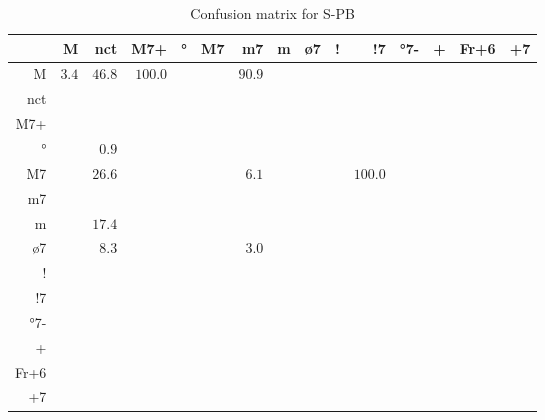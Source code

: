 \documentclass{article}
\begin{document}
\begin{table}
\begin{center}
\begin{tabular}{r|r|r|r|r|r|r|r|r|r|r|r|r|r|r}
       & M & nct & M7+ & ° & M7 & m7 & m & ø7 & ! & !7 & °7- & + & Fr+6 & +7 \\ \hline
 M & $3.4$ & $46.8$ & $100.0$ & $ $ & $ $ & $90.9$ & $ $ & $ $ & $ $ & $ $ & $ $ & $ $ & $ $ & $ $  \\ \hline
 nct & $ $ & $ $ & $ $ & $ $ & $ $ & $ $ & $ $ & $ $ & $ $ & $ $ & $ $ & $ $ & $ $ & $ $  \\ \hline
 M7+ & $ $ & $ $ & $ $ & $ $ & $ $ & $ $ & $ $ & $ $ & $ $ & $ $ & $ $ & $ $ & $ $ & $ $  \\ \hline
 ° & $ $ & $0.9$ & $ $ & $ $ & $ $ & $ $ & $ $ & $ $ & $ $ & $ $ & $ $ & $ $ & $ $ & $ $  \\ \hline
 M7 & $ $ & $26.6$ & $ $ & $ $ & $ $ & $6.1$ & $ $ & $ $ & $ $ & $100.0$ & $ $ & $ $ & $ $ & $ $  \\ \hline
 m7 & $ $ & $ $ & $ $ & $ $ & $ $ & $ $ & $ $ & $ $ & $ $ & $ $ & $ $ & $ $ & $ $ & $ $  \\ \hline
 m & $ $ & $17.4$ & $ $ & $ $ & $ $ & $ $ & $ $ & $ $ & $ $ & $ $ & $ $ & $ $ & $ $ & $ $  \\ \hline
 ø7 & $ $ & $8.3$ & $ $ & $ $ & $ $ & $3.0$ & $ $ & $ $ & $ $ & $ $ & $ $ & $ $ & $ $ & $ $  \\ \hline
 ! & $ $ & $ $ & $ $ & $ $ & $ $ & $ $ & $ $ & $ $ & $ $ & $ $ & $ $ & $ $ & $ $ & $ $  \\ \hline
 !7 & $ $ & $ $ & $ $ & $ $ & $ $ & $ $ & $ $ & $ $ & $ $ & $ $ & $ $ & $ $ & $ $ & $ $  \\ \hline
 °7- & $ $ & $ $ & $ $ & $ $ & $ $ & $ $ & $ $ & $ $ & $ $ & $ $ & $ $ & $ $ & $ $ & $ $  \\ \hline
 + & $ $ & $ $ & $ $ & $ $ & $ $ & $ $ & $ $ & $ $ & $ $ & $ $ & $ $ & $ $ & $ $ & $ $  \\ \hline
 Fr+6 & $ $ & $ $ & $ $ & $ $ & $ $ & $ $ & $ $ & $ $ & $ $ & $ $ & $ $ & $ $ & $ $ & $ $  \\ \hline
 +7 & $ $ & $ $ & $ $ & $ $ & $ $ & $ $ & $ $ & $ $ & $ $ & $ $ & $ $ & $ $ & $ $ & $ $  \\ \hline
\end{tabular}
\caption{Confusion matrix for S-PB}
\end{center}
\end{table}
\end{document}
